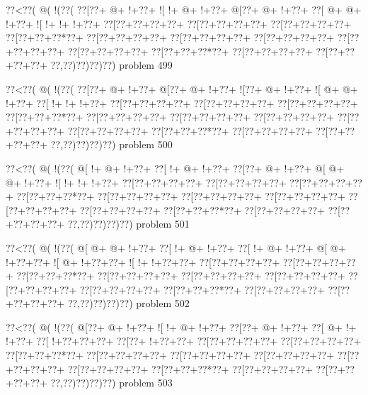 \vbox{\vbox{\goo
\0??<\0??(\- @(\- !(\0??(
\0??[\0??+\- @+\- !+\0??+
\- ![\- !+\- @+\- !+\0??+
\- @[\0??+\- @+\- !+\0??+
\0??[\- @+\- @+\- !+\0??+
\- ![\- !+\- !+\- !+\0??+
\0??[\0??+\0??+\0??+\0??+
\0??[\0??+\0??+\0??+\0??+
\0??[\0??+\0??+\0??+\0??+
\0??[\0??+\0??+\0??*\0??+
\0??[\0??+\0??+\0??+\0??+
\0??[\0??+\0??+\0??+\0??+
\0??[\0??+\0??+\0??+\0??+
\0??[\0??+\0??+\0??+\0??+
\0??[\0??+\0??+\0??+\0??+
\0??[\0??+\0??+\0??*\0??+
\0??[\0??+\0??+\0??+\0??+
\0??[\0??+\0??+\0??+\0??+
\0??,\0??)\0??)\0??)\0??)
}
\hfil problem 499\hfil\break
}

\vbox{\vbox{\goo
\0??<\0??(\- @(\- !(\0??(
\0??[\0??+\- @+\- !+\0??+
\- @[\0??+\- @+\- !+\0??+
\- ![\0??+\- @+\- !+\0??+
\- ![\- @+\- @+\- !+\0??+
\0??[\- !+\- !+\- !+\0??+
\0??[\0??+\0??+\0??+\0??+
\0??[\0??+\0??+\0??+\0??+
\0??[\0??+\0??+\0??+\0??+
\0??[\0??+\0??+\0??*\0??+
\0??[\0??+\0??+\0??+\0??+
\0??[\0??+\0??+\0??+\0??+
\0??[\0??+\0??+\0??+\0??+
\0??[\0??+\0??+\0??+\0??+
\0??[\0??+\0??+\0??+\0??+
\0??[\0??+\0??+\0??*\0??+
\0??[\0??+\0??+\0??+\0??+
\0??[\0??+\0??+\0??+\0??+
\0??,\0??)\0??)\0??)\0??)
}
\hfil problem 500\hfil\break
}

\vbox{\vbox{\goo
\0??<\0??(\- @(\- !(\0??(
\- @[\- !+\- @+\- !+\0??+
\0??[\- !+\- @+\- !+\0??+
\0??[\0??+\- @+\- !+\0??+
\- @[\- @+\- @+\- !+\0??+
\- ![\- !+\- !+\- !+\0??+
\0??[\0??+\0??+\0??+\0??+
\0??[\0??+\0??+\0??+\0??+
\0??[\0??+\0??+\0??+\0??+
\0??[\0??+\0??+\0??*\0??+
\0??[\0??+\0??+\0??+\0??+
\0??[\0??+\0??+\0??+\0??+
\0??[\0??+\0??+\0??+\0??+
\0??[\0??+\0??+\0??+\0??+
\0??[\0??+\0??+\0??+\0??+
\0??[\0??+\0??+\0??*\0??+
\0??[\0??+\0??+\0??+\0??+
\0??[\0??+\0??+\0??+\0??+
\0??,\0??)\0??)\0??)\0??)
}
\hfil problem 501\hfil\break
}

\vbox{\vbox{\goo
\0??<\0??(\- @(\- !(\0??(
\- @[\- @+\- @+\- !+\0??+
\0??[\- !+\- @+\- !+\0??+
\0??[\- !+\- @+\- !+\0??+
\- @[\- @+\- !+\0??+\0??+
\- ![\- @+\- !+\0??+\0??+
\- ![\- !+\- !+\0??+\0??+
\0??[\0??+\0??+\0??+\0??+
\0??[\0??+\0??+\0??+\0??+
\0??[\0??+\0??+\0??*\0??+
\0??[\0??+\0??+\0??+\0??+
\0??[\0??+\0??+\0??+\0??+
\0??[\0??+\0??+\0??+\0??+
\0??[\0??+\0??+\0??+\0??+
\0??[\0??+\0??+\0??+\0??+
\0??[\0??+\0??+\0??*\0??+
\0??[\0??+\0??+\0??+\0??+
\0??[\0??+\0??+\0??+\0??+
\0??,\0??)\0??)\0??)\0??)
}
\hfil problem 502\hfil\break
}

\vbox{\vbox{\goo
\0??<\0??(\- @(\- !(\0??(
\- @[\0??+\- @+\- !+\0??+
\- ![\- !+\- @+\- !+\0??+
\0??[\0??+\- @+\- !+\0??+
\0??[\- @+\- !+\- !+\0??+
\0??[\- !+\0??+\0??+\0??+
\0??[\0??+\- !+\0??+\0??+
\0??[\0??+\0??+\0??+\0??+
\0??[\0??+\0??+\0??+\0??+
\0??[\0??+\0??+\0??*\0??+
\0??[\0??+\0??+\0??+\0??+
\0??[\0??+\0??+\0??+\0??+
\0??[\0??+\0??+\0??+\0??+
\0??[\0??+\0??+\0??+\0??+
\0??[\0??+\0??+\0??+\0??+
\0??[\0??+\0??+\0??*\0??+
\0??[\0??+\0??+\0??+\0??+
\0??[\0??+\0??+\0??+\0??+
\0??,\0??)\0??)\0??)\0??)
}
\hfil problem 503\hfil\break
}

